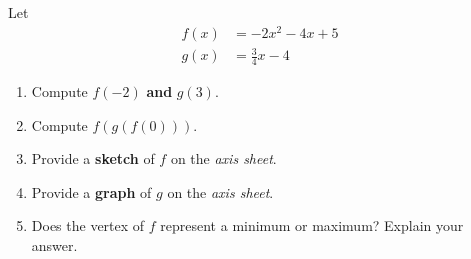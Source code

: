 \documentclass[12pt]{article} %
\begin{document}
\begin{qstn}
  Let 
  \begin{align*}
    f(x) &= -2x^2 - 4x + 5\\
    g(x) &= \frac{3}{4}x - 4
  \end{align*}
  \begin{enumerate}[label=(\alph*)]
    \item Compute $f(-2)$ \textbf{and} $g(3)$.
    \item Compute $f(g(f(0)))$.
    \item Provide a \textbf{sketch} of $f$ on the \emph{axis sheet}.
    \item Provide a \textbf{graph} of $g$ on the \emph{axis sheet}.
    \item Does the vertex of $f$ represent a minimum or maximum? Explain your answer.
  \end{enumerate}

\end{qstn}
\end{document}
